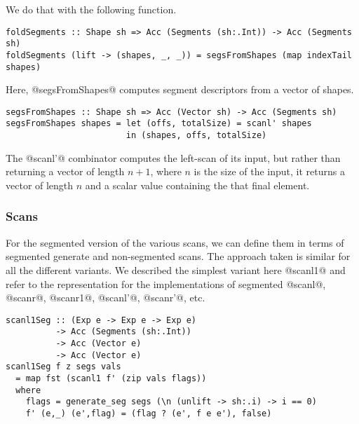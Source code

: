 %
We do that with the following function.
%
\begin{lstlisting}
foldSegments :: Shape sh => Acc (Segments (sh:.Int)) -> Acc (Segments sh)
foldSegments (lift -> (shapes, _, _)) = segsFromShapes (map indexTail shapes)
\end{lstlisting}
%
Here, @segsFromShapes@ computes segment descriptors from a vector of shapes.
%
\begin{lstlisting}
segsFromShapes :: Shape sh => Acc (Vector sh) -> Acc (Segments sh)
segsFromShapes shapes = let (offs, totalSize) = scanl' shapes
                        in (shapes, offs, totalSize)
\end{lstlisting}
%
The @scanl'@ combinator computes the left-scan of its input, but rather than returning a vector of length $n+1$, where $n$ is the size of the input, it returns a vector of length $n$ and a scalar value containing the that final element.

\subsubsection{Scans}

For the segmented version of the various scans, we can define them in terms of segmented generate and non-segmented scans. The approach taken is similar for all the different variants. We described the simplest variant here @scanl1@ and refer to the representation for the implementations of segmented @scanl@, @scanr@, @scanr1@, @scanl'@, @scanr'@, etc.
%
\begin{lstlisting}
scanl1Seg :: (Exp e -> Exp e -> Exp e)
          -> Acc (Segments (sh:.Int))
          -> Acc (Vector e)
          -> Acc (Vector e)
scanl1Seg f z segs vals
  = map fst (scanl1 f' (zip vals flags))
  where
    flags = generate_seg segs (\n (unlift -> sh:.i) -> i == 0)
    f' (e,_) (e',flag) = (flag ? (e', f e e'), false)
\end{lstlisting}
%

